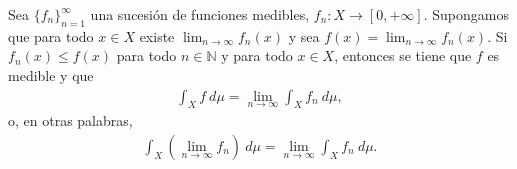 \begin{teo}
Sea  $\{ f_n \}_{n=1}^{\infty}$ una sucesión de funciones medibles, $f_n: X \longrightarrow [0,+\infty]$. Supongamos que para todo $x \in X$ existe $\lim_{n \to \infty}{f_n(x)}$ y sea $f(x) = \lim_{n \to \infty}{f_n(x)}$. Si $f_n(x) \leq f(x)$ para todo $n \in \mathbb{N}$ y para todo $x \in X$, entonces se tiene que $f$ es medible y que
\begin{align*}
    \int_{X}{f \ d\mu} = \lim_{n \to \infty}{\int_{X}{f_n \ d\mu}},
\end{align*}
o, en otras palabras,
\begin{align*}
    \int_{X}{\left( \lim_{n \to \infty}{f_n}\right) \ d\mu} = \lim_{n \to \infty}{\int_{X}{f_n \ d\mu}}.
\end{align*}
\end{teo}

